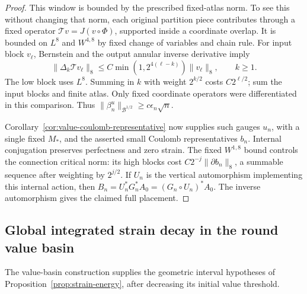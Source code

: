 \documentclass[11pt]{article}
\numberwithin{equation}{section}
\theoremstyle{definition}
\theoremstyle{remark}
\begin{document}
\begin{proof}
This window is bounded by the prescribed fixed-atlas norm.
To see this without changing that norm, each original
partition piece contributes through a fixed operator
\(\mathcal Tv=J(v\circ\Phi)\), supported inside a coordinate
overlap. It is bounded on \(L^8\) and \(W^{4,8}\) by fixed
change of variables and chain rule. For input block \(v_\ell\),
Bernstein and the output annular inverse derivative imply
\[
 \|\Delta_k\mathcal T v_\ell\|_8
 \le C\min(1,2^{4(\ell-k)})\|v_\ell\|_8,\qquad k\ge1 .
\]
The low block uses \(L^8\). Summing in \(k\) with weight
\(2^{k/2}\) costs \(C2^{\ell/2}\); sum the input blocks
and finite atlas. Only fixed coordinate operators were
differentiated in this comparison. Thus
\(\|\beta_n^u\|_{\mathcal B^{1/2}}\ge c\epsilon_n\sqrt n\).

Corollary~\ref{cor:value-coulomb-representative} now supplies
such gauges \(u_n\), with a single fixed \(M_*\), and the
asserted small Coulomb representatives \(b_n\).
Internal conjugation preserves perfectness and zero strain.
The fixed \(W^{1,8}\) bound controls the connection critical
norm: its high blocks cost
\(C2^{-j}\|\partial b_n\|_8\), a summable sequence after
weighting by \(2^{j/2}\).
If \(U_n\) is the vertical automorphism implementing this
internal action, then
\(B_n=U_n^*G_n^*A_0=(G_n\circ U_n)^*A_0\).
The inverse automorphism gives the claimed full placement.
\end{proof}


\subsection{Global integrated strain decay in the round value basin}
\label{subsec:global-value-strain-energy}

The value-basin construction supplies the geometric interval
hypotheses of Proposition~\ref{prop:strain-energy}, after
decreasing its initial value threshold.
\end{document}
